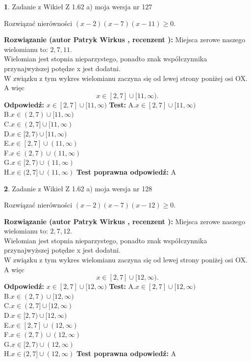\documentclass[12pt, a4paper]{article}
\theoremstyle{definition} %
\newtheorem{zad}{}
\newcommand{\zadStart}[1]{\begin{zad}#1\newline}
\newcommand{\zadStop}{\end{zad}}
\newcommand{\rozwStart}[2]{\noindent \textbf{Rozwiązanie (autor #1 , recenzent #2): }\newline}
\newcommand{\rozwStop}{\newline}
\newcommand{\odpStart}{\noindent \textbf{Odpowiedź:}\newline}
\newcommand{\odpStop}{\newline}
\newcommand{\testStart}{\noindent \textbf{Test:}\newline}
\newcommand{\testStop}{\newline}
\newcommand{\kluczStart}{\noindent \textbf{Test poprawna odpowiedź:}\newline}
\newcommand{\kluczStop}{\newline}
\begin{document}
\zadStart{Zadanie z Wikieł Z 1.62 a) moja wersja nr 127}

Rozwiązać nierówności $(x-2)(x-7)(x-11)\ge0$.
\zadStop
\rozwStart{Patryk Wirkus}{}
Miejsca zerowe naszego wielomianu to: $2, 7, 11$.\\
Wielomian jest stopnia nieparzystego, ponadto znak współczynnika przy\linebreak najwyższej potędze x jest dodatni.\\ W związku z tym wykres wielomianu zaczyna się od lewej strony poniżej osi OX. A więc $$x \in [2,7] \cup [11,\infty).$$
\rozwStop
\odpStart
$x \in [2,7] \cup [11,\infty)$
\odpStop
\testStart
A.$x \in [2,7] \cup [11,\infty)$\\
B.$x \in (2,7) \cup [11,\infty)$\\
C.$x \in (2,7] \cup [11,\infty)$\\
D.$x \in [2,7) \cup [11,\infty)$\\
E.$x \in [2,7] \cup (11,\infty)$\\
F.$x \in (2,7) \cup (11,\infty)$\\
G.$x \in [2,7) \cup (11,\infty)$\\
H.$x \in (2,7] \cup (11,\infty)$
\testStop
\kluczStart
A
\kluczStop



\zadStart{Zadanie z Wikieł Z 1.62 a) moja wersja nr 128}

Rozwiązać nierówności $(x-2)(x-7)(x-12)\ge0$.
\zadStop
\rozwStart{Patryk Wirkus}{}
Miejsca zerowe naszego wielomianu to: $2, 7, 12$.\\
Wielomian jest stopnia nieparzystego, ponadto znak współczynnika przy\linebreak najwyższej potędze x jest dodatni.\\ W związku z tym wykres wielomianu zaczyna się od lewej strony poniżej osi OX. A więc $$x \in [2,7] \cup [12,\infty).$$
\rozwStop
\odpStart
$x \in [2,7] \cup [12,\infty)$
\odpStop
\testStart
A.$x \in [2,7] \cup [12,\infty)$\\
B.$x \in (2,7) \cup [12,\infty)$\\
C.$x \in (2,7] \cup [12,\infty)$\\
D.$x \in [2,7) \cup [12,\infty)$\\
E.$x \in [2,7] \cup (12,\infty)$\\
F.$x \in (2,7) \cup (12,\infty)$\\
G.$x \in [2,7) \cup (12,\infty)$\\
H.$x \in (2,7] \cup (12,\infty)$
\testStop
\kluczStart
A
\kluczStop
\end{document}
